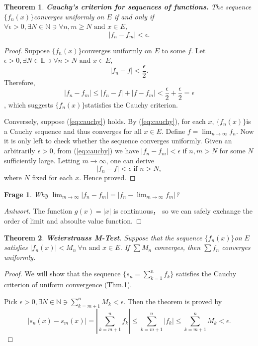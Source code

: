 \documentclass[12pt]{article}
\newtheorem{thm}{Theorem}[section]
\newtheorem*{q}{Frage}
\newcommand{\limn}{\lim_{n \rightarrow \infty}}
\newcommand{\fseq}{$\{f_n(x)\}$}
\newcommand{\N}{\mathbb{N}}
\begin{document}
\begin{thm}\label{thm:uni_cauchy}\textbf{Cauchy's criterion for sequences of functions.}
	The sequence \fseq converges uniformly on $E$ if and only if $\forall \epsilon > 0, \exists N \in \N \ni \forall n, m \geq N \text{ and } x \in E$,
	\begin{equation}
		|f_n - f_m| < \epsilon.
		\label{eq:cauchy}
	\end{equation}
\end{thm}
\begin{proof}
	Suppose \fseq converges uniformly on $E$ to some $f$. Let $\epsilon > 0, \exists N \in \mathbb{E} \ni \forall n > N \text{ and } x \in E$, \[ |f_n - f| < \frac{\epsilon}{2}. \] Therefore, \[ |f_n - f_m| \leq |f_n - f| + |f - f_m| < \frac{\epsilon}{2} + \frac{\epsilon}{2} = \epsilon \], which suggests \fseq statisfies the Cauchy criterion.
	
	Conversely, suppose (\ref{eq:cauchy}) holds. By (\ref{eq:cauchy}), for each $x$, \fseq is a Cauchy sequence and thus converges for all $x \in E$. Define $f = \limn f_n$. Now it is only left to check whether the sequence converges uniformly. Given an arbitrarily $\epsilon > 0$, from (\ref{eq:cauchy}) we have $|f_n - f_m| < \epsilon$ if $n, m > N$ for some $N$ sufficiently large. Letting $ m \rightarrow \infty $, one can derive \[|f_n - f| < \epsilon \text{ if } n > N,\] where $N$ fixed for each $x$. Hence proved. 
\end{proof}

\begin{q}
	Why $\lim_{m \rightarrow \infty} |f_n - f_m| = |f_n - \lim_{m \rightarrow \infty} f_m|$?
\end{q}
\begin{proof}[Antwort]
	The function $g(x) = |x|$ is continuous， so we can safely exchange the order of limit and absoulte value function.
\end{proof}

\begin{thm}\label{thm:mtest}\textbf{Weierstrauss M-Test}.
	Suppose that the sequence \fseq on $E$ satisfies $|f_n(x)| < M_n ~\forall n \text{ and } x \in E$. If $\sum M_n$ converges, then $\sum f_n$ converges uniformly.
\end{thm}
\begin{proof}
	We will show that the sequence $\{s_n = \sum_{k = 1}^{n} f_k\}$ satisfies the Cauchy criterion of uniform convergence (Thm.\ref{thm:uni_cauchy}).
	
	Pick $\epsilon > 0, \exists N \in \N \ni \sum_{k = m+1}^{n}M_k < \epsilon$. Then the theorem is proved by \[|s_n(x) - s_m(x)| = \left|\sum_{k = m+1}^{n} f_k\right| \leq \sum_{k=m+1}^{n}|f_k| \leq \sum_{k = m+1}^{n}M_k < \epsilon. \]
\end{proof}
\end{document}

